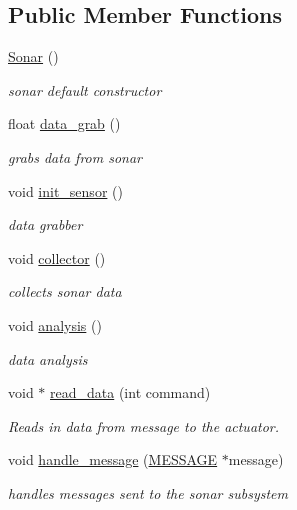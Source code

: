 \subsection*{Public Member Functions}
\begin{DoxyCompactItemize}
\item 
\hyperlink{classSonar_a71ef009d138f1e372fc35ca0cb6e85e2}{Sonar} ()
\begin{DoxyCompactList}\small\item\em sonar default constructor \end{DoxyCompactList}\item 
float \hyperlink{classSonar_aa4e807cbed15ce1d46ddcef05b6b59fb}{data\-\_\-grab} ()
\begin{DoxyCompactList}\small\item\em grabs data from sonar \end{DoxyCompactList}\item 
void \hyperlink{classSonar_af91d04cbc441084ba608a49c2be88d5b}{init\-\_\-sensor} ()
\begin{DoxyCompactList}\small\item\em data grabber \end{DoxyCompactList}\item 
void \hyperlink{classSonar_a38b0e409082be17e7098b2e471bab4a8}{collector} ()
\begin{DoxyCompactList}\small\item\em collects sonar data \end{DoxyCompactList}\item 
void \hyperlink{classSonar_a11a32c64528f8e69fdde4722f3b3bc7b}{analysis} ()
\begin{DoxyCompactList}\small\item\em data analysis \end{DoxyCompactList}\item 
void $\ast$ \hyperlink{classSonar_a54f55470741873f333ad8af8a98affc8}{read\-\_\-data} (int command)
\begin{DoxyCompactList}\small\item\em Reads in data from message to the actuator. \end{DoxyCompactList}\item 
\hypertarget{classSonar_a5f9b0f57b5a05b03b0dcb5ab830592ff}{void \hyperlink{classSonar_a5f9b0f57b5a05b03b0dcb5ab830592ff}{handle\-\_\-message} (\hyperlink{SUBSYS__COMMANDS_8h_ad814416fc1a8c675bea2687d96088a8f}{M\-E\-S\-S\-A\-G\-E} $\ast$message)}\label{classSonar_a5f9b0f57b5a05b03b0dcb5ab830592ff}

\begin{DoxyCompactList}\small\item\em handles messages sent to the sonar subsystem \end{DoxyCompactList}\end{DoxyCompactItemize}
